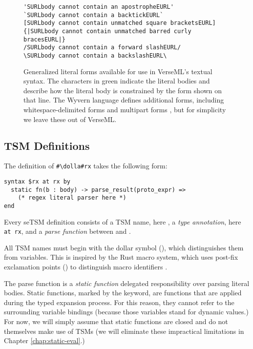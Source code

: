 

\begin{figure}
\begin{lstlisting}
'SURLbody cannot contain an apostropheEURL'
`SURLbody cannot contain a backtickEURL`
[SURLbody cannot contain unmatched square bracketsEURL]
{|SURLbody cannot contain unmatched barred curly bracesEURL|}
/SURLbody cannot contain a forward slashEURL/
\SURLbody cannot contain a backslashEURL\
\end{lstlisting}
\caption[Available Generalized Literal Forms]{Generalized literal forms available for use in VerseML's textual syntax. The characters in green indicate the literal bodies and describe how the literal body is constrained by the form shown on that line. The Wyvern language defines additional forms, including whitespace-delimited forms \cite{TSLs} and multipart forms \cite{sac15}, but for simplicity we leave these out of VerseML.}
\label{fig:literal-forms}
\end{figure}
\subsection{TSM Definitions}\label{sec:uetsms-definition}
The definition of \lstinline{#\dolla#rx} takes the following form:
\begin{lstlisting}[numbers=none,mathescape=|]
syntax $rx at rx by 
  static fn(b : body) -> parse_result(proto_expr) => 
    (* regex literal parser here *)
end
\end{lstlisting}
Every seTSM definition consists of a TSM name, here , a \emph{type annotation}, here \lstinline{at rx}, and a \emph{parse function} between  and .

All TSM names must begin with the dollar symbol (\li{#\dolla#}), which distinguishes them from variables. This is inspired by the Rust macro system, which uses post-fix exclamation points (\li{!}) to distinguish macro identifiers \cite{Rust/Macros}.

The {parse function} is a \emph{static function} delegated responsibility over parsing literal bodies. Static functions, marked by the  keyword, are functions that are applied during the typed expansion process. For this reason, they cannot refer to the surrounding variable bindings (because those variables stand for dynamic values.) For now, we will simply assume that static functions are closed and do not themselves make use of TSMs (we will eliminate these impractical limitations in Chapter \ref{chap:static-eval}.)

